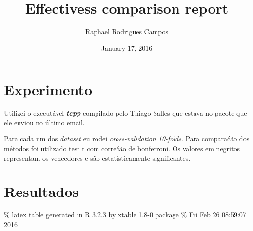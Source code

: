 \documentclass[]{article}
\title{Effectivess comparison report}
\author{Raphael Rodrigues Campos}
\date{January 17, 2016}
\begin{document}
\maketitle


\section{Experimento}\label{experimento}

Utilizei o executável \textbf{\emph{tcpp}} compilado pelo Thiago Salles
que estava no pacote que ele enviou no último email.

Para cada um dos \emph{dataset} eu rodei \emph{cross-validation
10-folds}. Para comparaćão dos métodos foi utilizado test t com correćão
de bonferroni. Os valores em negritos representam os vencedores e são
estatisticamente significantes.

\section{Resultados}\label{resultados}

\% latex table generated in R 3.2.3 by xtable 1.8-0 package \% Fri Feb
26 08:59:07 2016
\end{document}
